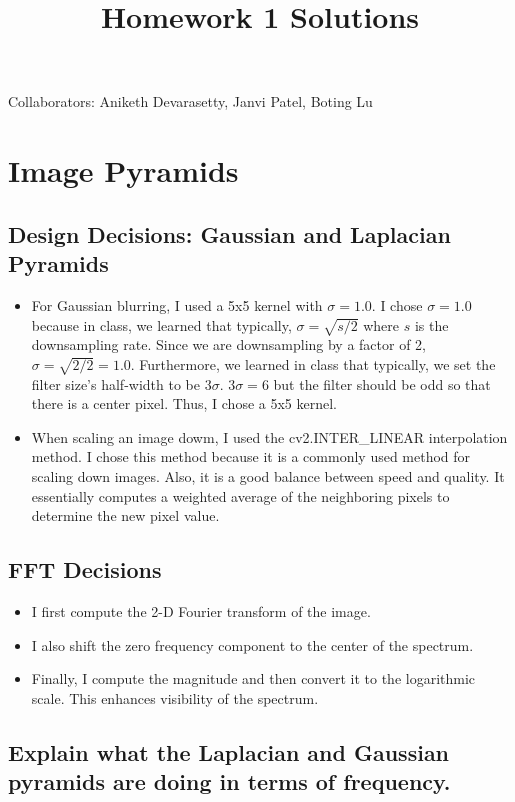 \documentclass[12pt]{article}
\begin{document}
\title{Homework 1 Solutions}

Collaborators: Aniketh Devarasetty, Janvi Patel, Boting Lu

\section{Image Pyramids}

\subsection{Design Decisions: Gaussian and Laplacian Pyramids}
\begin{itemize}
    \item For Gaussian blurring, I used a 5x5 kernel with $\sigma = 1.0$. I chose $\sigma = 1.0$ because in class, we learned that typically, $\sigma = \sqrt{s/2}$ where $s$ is the downsampling rate. Since we are downsampling by a factor of 2, $\sigma = \sqrt{2/2} = 1.0$. Furthermore, we learned in class that typically, we set the filter size's half-width to be $3\sigma$. $3\sigma = 6$ but the filter should be odd so that there is a center pixel. Thus, I chose a 5x5 kernel.
    \item When scaling an image dowm, I used the cv2.INTER\_LINEAR interpolation method. I chose this method because it is a commonly used method for scaling down images. Also, it is a good balance between speed and quality. It essentially computes a weighted average of the neighboring pixels to determine the new pixel value.
\end{itemize}

\subsection{FFT Decisions}
\begin{itemize}
    \item I first compute the 2-D Fourier transform of the image.
    \item I also shift the zero frequency component to the center of the spectrum. 
    \item Finally, I compute the magnitude and then convert it to the logarithmic scale. This enhances visibility of the spectrum.
\end{itemize}

\subsection{Explain what the Laplacian and Gaussian pyramids are doing in terms of frequency.}
\end{document}
